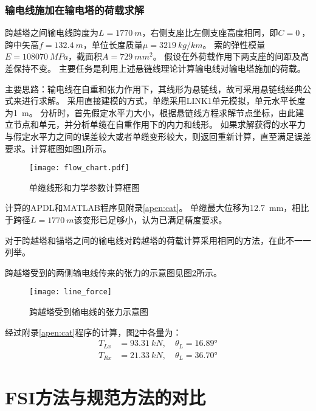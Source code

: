 \subsubsection{输电线施加在输电塔的荷载求解}

跨越塔之间输电线跨度为$L=\SI{1770}{m}$，右侧支座比左侧支座高度相同，即$C=\SI{0}{}$，跨中矢高$f=\SI{132.4}{m}$，单位长度质量$\mu=\SI{3219}{kg/km}$。
索的弹性模量$E=\SI{108070}{MPa}$，截面积$A=\SI{729}{mm^2}$。
假设在外荷载作用下两支座的间距及高差保持不变。
主要任务是利用上述悬链线理论计算输电线对输电塔施加的荷载。

主要思路：输电线在自重和张力作用下，其线形为悬链线，故可采用悬链线经典公式来进行求解。
采用直接建模的方式，单缆采用LINK1单元模拟，单元水平长度为\SI{1}{m}。
分析时，首先假定水平力大小，根据悬链线方程求解节点坐标，由此建立节点和单元，并分析单缆在自重作用下的内力和线形。
如果求解获得的水平力与假定水平力之间的误差较大或者单缆变形较大，则返回重新计算，直至满足误差要求。计算框图如图\ref{fig:flow-chart}所示。

\begin{figure}[!htpb]
	\centering
	\texttt{[image: flow\_chart.pdf]}
	\caption{单缆线形和力学参数计算框图}
	\label{fig:flow-chart}
\end{figure}

计算的APDL和MATLAB程序见附录\ref{apen:cat}。
单缆最大位移为\SI{12.7}{mm}，相比于跨径$L=\SI{1770}{m}$该变形已足够小，认为已满足精度要求。

对于跨越塔和锚塔之间的输电线对跨越塔的荷载计算采用相同的方法，在此不一一列举。

跨越塔受到的两侧输电线传来的张力的示意图见图\ref{fig:line-force}所示。

\begin{figure}[!htbp]
	\centering
	\texttt{[image: line\_force]}
	\caption{跨越塔受到输电线的张力示意图}
	\label{fig:line-force}
\end{figure}

经过附录\ref{apen:cat}程序的计算，图\ref{fig:line-force}中各量为：
\begin{equation}
	\begin{split}
		T_{Lx} & = \SI{93.31}{kN},\quad \theta_L  = \ang{16.89} \\
		T_{Rx} & = \SI{21.33}{kN},\quad \theta_L  = \ang{36.70}
	\end{split}
\end{equation}


\section{FSI方法与规范方法的对比}\label{sec:static-results}

